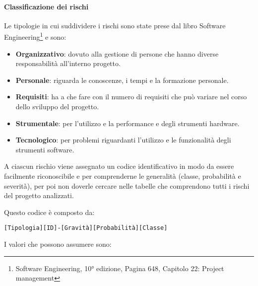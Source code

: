 			\paragraph{Classificazione dei rischi}
			Le tipologie in cui suddividere i rischi sono state prese dal libro Software Engineering\footnote{Software Engineering, 10° edizione, Pagina 648, Capitolo 22: Project management} e sono:
			\begin{itemize}
				\item \textbf{Organizzativo}: dovuto alla gestione di persone che hanno diverse responsabilità all'interno progetto.
				\item \textbf{Personale}: riguarda le conoscenze, i tempi e la formazione personale.
				\item \textbf{Requisiti}: ha a che fare con il numero di requisiti che può variare nel corso dello sviluppo del progetto. %
				\item \textbf{Strumentale}: per l'utilizzo e la performance e degli strumenti hardware.
				\item \textbf{Tecnologico}: per problemi riguardanti l'utilizzo e le funzionalità degli strumenti software.
			\end{itemize}
			
			A ciascun rischio viene assegnato un codice identificativo in modo da essere facilmente riconoscibile e per comprenderne le generalità (classe, probabilità e severità), per poi non doverle cercare nelle tabelle che comprendono tutti i rischi del progetto analizzati.
			
			Questo codice è composto da:
			
			\begin{center}
				\texttt{[Tipologia][ID]-[Gravità][Probabilità][Classe]}
			\end{center}
			
			I valori che possono assumere sono:
			
